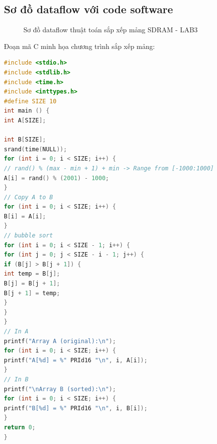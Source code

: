 \subsection{Sơ đồ dataflow với code software}

\begin{figure}[H]
    \centering
    \caption{Sơ đồ dataflow thuật toán sắp xếp mảng SDRAM - LAB3}
\end{figure}

Đoạn mã C minh họa chương trình sắp xếp mảng:
\begin{lstlisting}[language=C, caption={C Source Code - LAB3}]
#include <stdio.h>
#include <stdlib.h>
#include <time.h>
#include <inttypes.h>
#define SIZE 10
int main () {
int A[SIZE];

int B[SIZE];
srand(time(NULL));
for (int i = 0; i < SIZE; i++) {
// rand() % (max - min + 1) + min -> Range from [-1000:1000]
A[i] = rand() % (2001) - 1000;
}
// Copy A to B
for (int i = 0; i < SIZE; i++) {
B[i] = A[i];
}
// bubble sort
for (int i = 0; i < SIZE - 1; i++) {
for (int j = 0; j < SIZE - i - 1; j++) {
if (B[j] > B[j + 1]) {
int temp = B[j];
B[j] = B[j + 1];
B[j + 1] = temp;
}
}
}
// In A
printf("Array A (original):\n");
for (int i = 0; i < SIZE; i++) {
printf("A[%d] = %" PRId16 "\n", i, A[i]);
}
// In B
printf("\nArray B (sorted):\n");
for (int i = 0; i < SIZE; i++) {
printf("B[%d] = %" PRId16 "\n", i, B[i]);
}
return 0;
}
\end{lstlisting}

